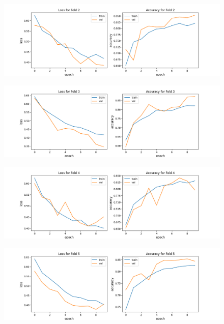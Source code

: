 \begin{appendices}
\begin{figure}[hbtp]
\centering
\includegraphics[scale=0.5]{../Images/cnn01_fold_2_plot.png}
\end{figure}
\begin{figure}[hbtp]

\centering
\includegraphics[scale=0.5]{../Images/cnn01_fold_3_plot.png}
\end{figure}
\begin{figure}[hbtp]

\centering
\includegraphics[scale=0.5]{../Images/cnn01_fold_4_plot.png}
\end{figure}
\begin{figure}[hbtp]

\centering
\includegraphics[scale=0.5]{../Images/cnn01_fold_5_plot.png}
\end{figure}
\begin{figure}[hbtp]


\end{figure}
\end{appendices}
